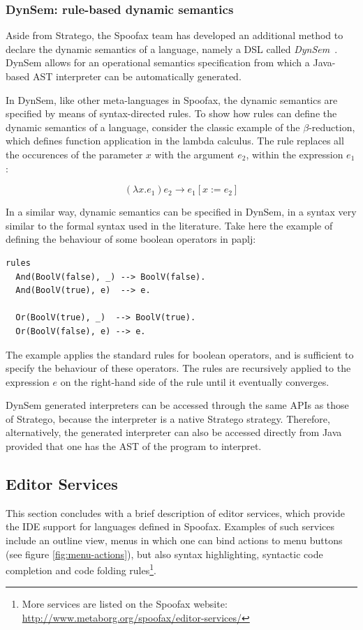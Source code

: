 \subsubsection{DynSem: rule-based dynamic semantics}
\label{ssec:dynsem}
Aside from Stratego, the Spoofax team has developed an additional
method to declare the dynamic semantics of a language, namely a DSL
called \emph{DynSem}~\cite{VerguNV15}. DynSem allows for an operational
semantics specification from which a Java-based AST interpreter can be
automatically generated.

In DynSem, like other meta-languages in Spoofax, the dynamic semantics
are specified by means of syntax-directed rules. To show how rules can
define the dynamic semantics of a language, consider the classic
example of the \(\beta\)-reduction, which defines function application in
the lambda calculus. The rule replaces all the occurences of the
parameter \(x\) with the argument \(e_2\), within the expression \(e_1\):

\begin{equation}
(\lambda x.e_1) e_2 \rightarrow e_1[x := e_2]
\end{equation}

In a similar way, dynamic semantics can be specified in DynSem, in a
syntax very similar to the formal syntax used in the literature. Take
here the example of defining the behaviour of some boolean operators
in paplj:
\lstset{language=dynsem,numbers=left}
\begin{lstlisting}
rules
  And(BoolV(false), _) --> BoolV(false).
  And(BoolV(true), e)  --> e.

  Or(BoolV(true), _)  --> BoolV(true).
  Or(BoolV(false), e) --> e.
\end{lstlisting}
The example applies the standard rules for boolean operators, and is
sufficient to specify the behaviour of these operators. The rules are
recursively applied to the expression \(e\) on the right-hand side of
the rule until it eventually converges.

DynSem generated interpreters can be accessed through the same APIs as
those of Stratego, because the interpreter is a native Stratego
strategy. Therefore, alternatively, the generated interpreter can also
be accessed directly from Java provided that one has the AST of the
program to interpret.

\lstset{numbers=none}
\subsection{Editor Services}
\label{sec:editor-serv}
This section concludes with a brief description of editor services,
which provide the IDE support for languages defined in
Spoofax. Examples of such services include an outline view, menus in
which one can bind actions to menu buttons (see figure
\ref{fig:menu-actions}), but also syntax highlighting, syntactic code
completion and code folding rules\footnote{More services are
listed on the Spoofax website:
\url{http://www.metaborg.org/spoofax/editor-services/}}.

